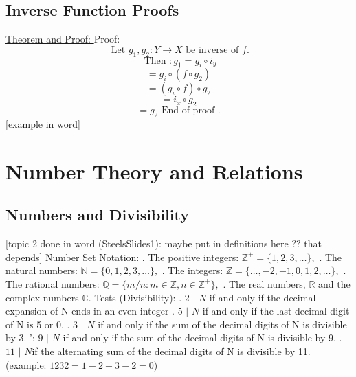 \documentclass{article}
\begin{document}
\subsection{Inverse Function Proofs}
\underline{ Theorem and Proof: }
\newline
\newline
{}
\newline
\newline
Proof:
\newline
\newline
$$\text{ Let } g_1, g_2: Y \rightarrow X \text{ be inverse of }f.$$
$$\text{ Then }: g_1 = g_i \circ i_y$$
$$ = g_i \circ (f \circ g_2)$$
$$ = (g_i \circ f) \circ g_2$$
$$ = i_x \circ g_2$$
$$ = g_2 \text{ End of proof }.$$
[example in word]
\newpage
\section{Number Theory and Relations}
\subsection{Numbers and Divisibility}
[topic 2 done in word (SteelsSlides1): maybe put in definitions here ?? that depends]
\newline
\newline
Number Set Notation:
\newline
{}. The positive integers: $\mathbb{Z}^+ = \{ 1, 2, 3, \dots\},$
. The natural numbers: $\mathbb{N} = \{ 0, 1, 2, 3, \dots\},$
. The integers: $\mathbb{Z} = \{\dots, -2, -1, 0, 1, 2, \dots\},$
. The rational numbers: $\mathbb{Q} = \{ m/n : m \in \mathbb{Z}, n \in \mathbb{Z}^+ \},$
. The real numbers, $\mathbb{R}$ and the complex numbers $\mathbb{C}.$
\newline
\newline
Tests (Divisibility):
\newline
{}. $2\text{ | } N$ if and only if the decimal expansion of N ends in an even integer
. $5 \text{ | } N$ if and only if the last decimal digit of N is 5 or 0.
. $3 \text{ | } N$ if and only if the sum of the decimal digits of N is divisible by 3.
': $9 \text{ | } N$ if and only if the sum of the decimal digits of N is divisible by 9.
. $11 \text{ | } N$if the alternating sum of the decimal digits of N is divisible by 11. 
\newline
(example: $1232 = 1 - 2 + 3 - 2 = 0$)
\newline
{}
\newpage
\end{document}
